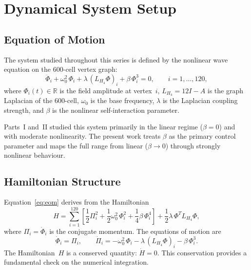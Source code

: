 \documentclass[12pt,a4paper]{article}
\newcommand{\Lmat}{L_{H_4}}
\newcommand{\R}{\mathbb{R}}
\begin{document}
\section{Dynamical System Setup}\label{sec:system}

\subsection{Equation of Motion}

The system studied throughout this series is defined by the nonlinear
wave equation on the 600-cell vertex graph:
\begin{equation}\label{eq:eom}
  \ddot{\Phi}_i + \omega_0^2 \, \Phi_i
  + \lambda \, (\Lmat \Phi)_i
  + \beta \, \Phi_i^3 = 0,
  \qquad i = 1, \ldots, 120,
\end{equation}
where $\Phi_i(t) \in \R$ is the field amplitude at vertex~$i$,
$\Lmat = 12I - A$ is the graph Laplacian of the 600-cell,
$\omega_0$ is the base frequency, $\lambda$ is the Laplacian coupling
strength, and $\beta$ is the nonlinear self-interaction parameter.

Parts~I and~II studied this system primarily in the linear regime
($\beta = 0$) and with moderate nonlinearity.  The present work
treats $\beta$ as the primary control parameter and maps the full
range from linear ($\beta \to 0$) through strongly nonlinear
behaviour.

\subsection{Hamiltonian Structure}

Equation~\eqref{eq:eom} derives from the Hamiltonian
\begin{equation}\label{eq:ham}
  H = \sum_{i=1}^{120} \left[
    \frac{1}{2} \Pi_i^2
    + \frac{1}{2} \omega_0^2 \, \Phi_i^2
    + \frac{1}{4} \beta \, \Phi_i^4
  \right]
  + \frac{1}{2} \lambda \, \Phi^T \Lmat \Phi,
\end{equation}
where $\Pi_i = \dot{\Phi}_i$ is the conjugate momentum.  The
equations of motion are
\begin{equation}\label{eq:hamilton_eqs}
  \dot{\Phi}_i = \Pi_i, \qquad
  \dot{\Pi}_i = -\omega_0^2 \, \Phi_i
    - \lambda \, (\Lmat \Phi)_i - \beta \, \Phi_i^3.
\end{equation}
The Hamiltonian~$H$ is a conserved quantity: $\dot{H} = 0$.  This
conservation provides a fundamental check on the numerical integration.
\end{document}
